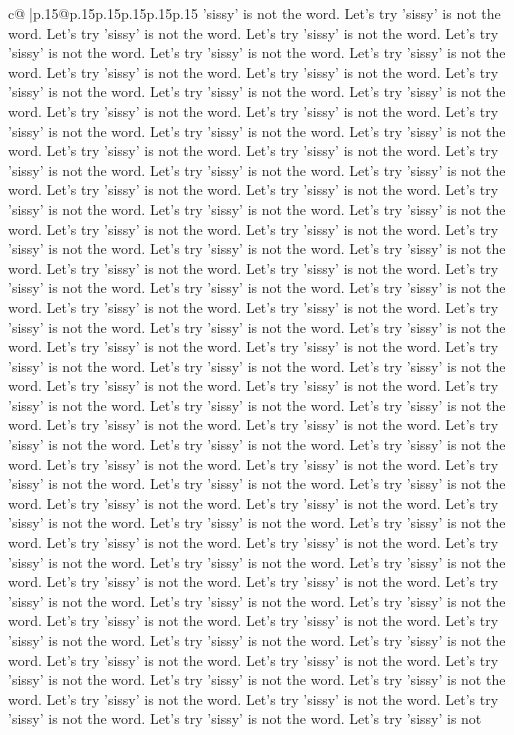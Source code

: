 \documentclass{article}
\begin{document}
{\begin{supertabular}{c@{$\;$}|p{.15\linewidth}@{}p{.15\linewidth}p{.15\linewidth}p{.15\linewidth}p{.15\linewidth}p{.15\linewidth}}
{{{'sissy' is not the word. Let's try 'sissy' is not the word. Let's try 'sissy' is not the word. Let's try 'sissy' is not the word. Let's try 'sissy' is not the word. Let's try 'sissy' is not the word. Let's try 'sissy' is not the word. Let's try 'sissy' is not the word. Let's try 'sissy' is not the word. Let's try 'sissy' is not the word. Let's try 'sissy' is not the word. Let's try 'sissy' is not the word. Let's try 'sissy' is not the word. Let's try 'sissy' is not the word. Let's try 'sissy' is not the word. Let's try 'sissy' is not the word. Let's try 'sissy' is not the word. Let's try 'sissy' is not the word. Let's try 'sissy' is not the word. Let's try 'sissy' is not the word. Let's try 'sissy' is not the word. Let's try 'sissy' is not the word. Let's try 'sissy' is not the word. Let's try 'sissy' is not the word. Let's try 'sissy' is not the word. Let's try 'sissy' is not the word. Let's try 'sissy' is not the word. Let's try 'sissy' is not the word. Let's try 'sissy' is not the word. Let's try 'sissy' is not the word. Let's try 'sissy' is not the word. Let's try 'sissy' is not the word. Let's try 'sissy' is not the word. Let's try 'sissy' is not the word. Let's try 'sissy' is not the word. Let's try 'sissy' is not the word. Let's try 'sissy' is not the word. Let's try 'sissy' is not the word. Let's try 'sissy' is not the word. Let's try 'sissy' is not the word. Let's try 'sissy' is not the word. Let's try 'sissy' is not the word. Let's try 'sissy' is not the word. Let's try 'sissy' is not the word. Let's try 'sissy' is not the word. Let's try 'sissy' is not the word. Let's try 'sissy' is not the word. Let's try 'sissy' is not the word. Let's try 'sissy' is not the word. Let's try 'sissy' is not the word. Let's try 'sissy' is not the word. Let's try 'sissy' is not the word. Let's try 'sissy' is not the word. Let's try 'sissy' is not the word. Let's try 'sissy' is not the word. Let's try 'sissy' is not the word. Let's try 'sissy' is not the word. Let's try 'sissy' is not the word. Let's try 'sissy' is not the word. Let's try 'sissy' is not the word. Let's try 'sissy' is not the word. Let's try 'sissy' is not the word. Let's try 'sissy' is not the word. Let's try 'sissy' is not the word. Let's try 'sissy' is not the word. Let's try 'sissy' is not the word. Let's try 'sissy' is not the word. Let's try 'sissy' is not the word. Let's try 'sissy' is not the word. Let's try 'sissy' is not the word. Let's try 'sissy' is not the word. Let's try 'sissy' is not the word. Let's try 'sissy' is not the word. Let's try 'sissy' is not the word. Let's try 'sissy' is not the word. Let's try 'sissy' is not the word. Let's try 'sissy' is not the word. Let's try 'sissy' is not the word. Let's try 'sissy' is not the word. Let's try 'sissy' is not the word. Let's try 'sissy' is not the word. Let's try 'sissy' is not the word. Let's try 'sissy' is not the word. Let's try 'sissy' is not the word. Let's try 'sissy' is not the word. Let's try 'sissy' is not the word. Let's try 'sissy' is not the word. Let's try 'sissy' is not the word. Let's try 'sissy' is not the word. Let's try 'sissy' is not the word. Let's try 'sissy' is not the word. Let's try 'sissy' is not }}}
\end{supertabular}}
\end{document}
